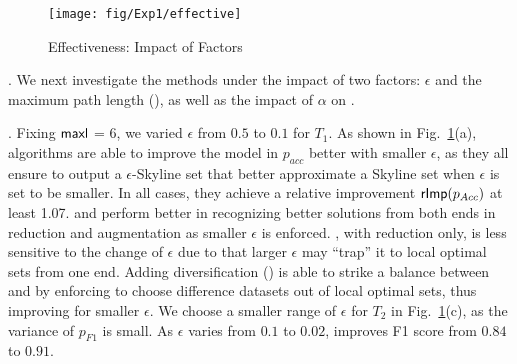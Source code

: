 \begin{figure}[tb!]
\centerline{\texttt{[image: fig/Exp1/effective]}}
\centering
\vspace{-1ex}
\caption{Effectiveness: Impact of Factors}
 \vspace{-4ex}
\label{fig-effective}
\end{figure}



. 
We next investigate the \modis methods
under the impact of two factors: $\epsilon$ and the maximum path length (\maxl), as well as the impact of $\alpha$ on \divmodis. 

.
Fixing ${\mathsf{maxl}}$ = 6, we varied $\epsilon$ from $0.5$ to $0.1$ for $T_1$. 
As shown in Fig.~\ref{fig-effective}(a), 
\modis algorithms are able to improve the 
model in $p_{acc}$ better with smaller $\epsilon$, 
as they all ensure to output a $\epsilon$-Skyline set that 
better approximate a Skyline set when $\epsilon$ is set to be 
smaller. In all cases, they achieve a relative improvement 
${\mathsf{rImp}}(p_{Acc})$ at least 1.07. 
\bimodis and \nomodis perform better 
in recognizing better solutions from both ends in 
reduction and augmentation as smaller $\epsilon$ is enforced. \apxmodis, 
with reduction only, is less sensitive to 
the change of $\epsilon$ due to that larger $\epsilon$ 
may ``trap'' it to  local 
optimal sets from one end. Adding diversification (\divmodis) is able to strike a balance between \apxmodis and \bimodis by enforcing to choose difference datasets out of local 
optimal sets, thus 
improving \apxmodis for smaller $\epsilon$. We choose a smaller range of $\epsilon$ for $T_2$ in Fig.~\ref{fig-effective}(c), as the variance of $p_{F1}$ is small.
As $\epsilon$ varies from $0.1$ to $0.02$, 
\nomodis 
improves F1 score from $0.84$ to $0.91$.

